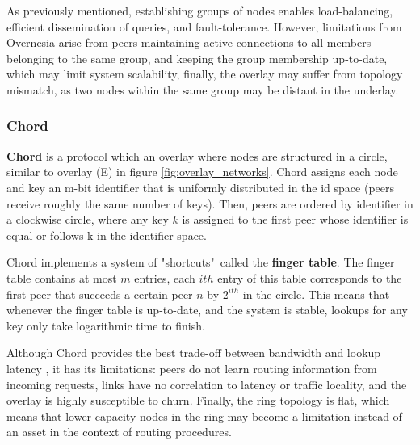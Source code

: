 As previously mentioned, establishing groups of nodes enables load-balancing, efficient dissemination of queries, and fault-tolerance. However, limitations from Overnesia arise from peers maintaining active connections to all members belonging to the same group, and keeping the group membership up-to-date, which may limit system scalability, finally, the overlay may suffer from topology mismatch, as two nodes within the same group may be distant in the underlay.

\subsubsection* {Chord}

\textbf{Chord} \cite{stoica2003chord} is a protocol which an overlay where nodes are structured in a circle, similar to overlay (E) in figure \ref{fig:overlay_networks}. Chord assigns each node and key an m-bit identifier that is uniformly distributed in the id space (peers receive roughly the same number of keys). Then, peers are ordered by identifier in a clockwise circle, where any key \(k\) is assigned to the first peer whose identifier is equal or follows k in the identifier space. 

Chord implements a system of "shortcuts"\ called the \textbf{finger table}. The finger table contains at most \(m\) entries, each $ith$ entry of this table corresponds to the first peer that succeeds a certain peer \(n\) by \(2^{ith}\) in the circle. This means that whenever the finger table is up-to-date, and the system is stable, lookups for any key only take logarithmic time to finish. 

Although Chord provides the best trade-off between bandwidth and lookup latency \cite{dht_performance_churn}, it has its limitations: peers do not learn routing information from incoming requests, links have no correlation to latency or traffic locality, and the overlay is highly susceptible to churn. Finally, the ring topology is flat, which means that lower capacity nodes in the ring may become a limitation instead of an asset in the context of routing procedures.



